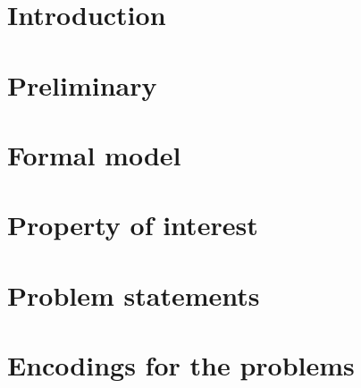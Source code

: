 \documentclass[smallcondensed]{svjour3}     %
\begin{document}
\date{Received: date / Accepted: date}

\maketitle


\begin{abstract}

\end{abstract}

\section{Introduction}
\label{sec:intro}


\section{Preliminary}
\label{sec:prelim}


\section{Formal model}
\label{sec:model}


\section{Property of interest}
\label{sec:property}


\section{Problem statements}
\label{sec:problem}


\section{Encodings for the problems}
\label{sec:encoding}

\end{document}
